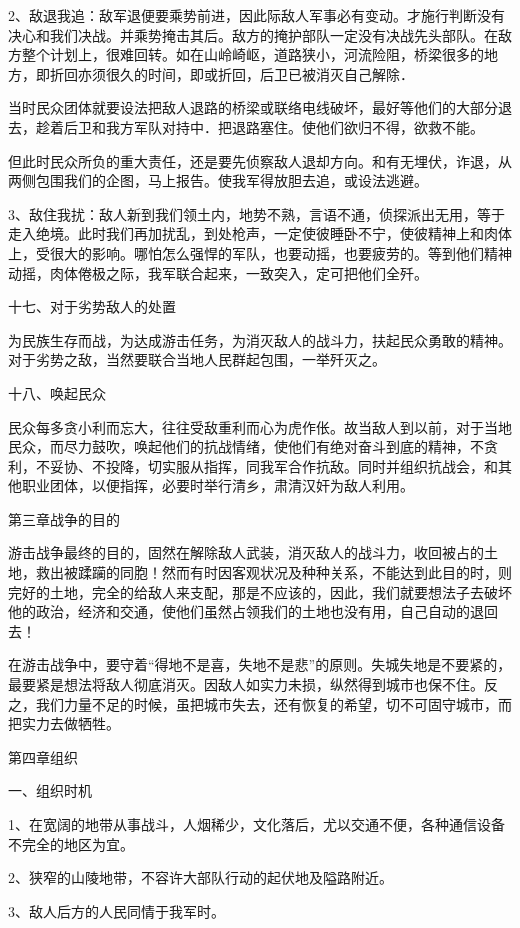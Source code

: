2、敌退我追：敌军退便要乘势前进，因此际敌人军事必有变动。才施行判断没有决心和我们决战。并乘势掩击其后。敌方的掩护部队一定没有决战先头部队。在敌方整个计划上，很难回转。如在山岭崎岖，道路狭小，河流险阻，桥梁很多的地方，即折回亦须很久的时间，即或折回，后卫已被消灭自己解除．

当时民众团体就要设法把敌人退路的桥梁或联络电线破坏，最好等他们的大部分退去，趁着后卫和我方军队对持中．把退路塞住。使他们欲归不得，欲救不能。

但此时民众所负的重大责任，还是要先侦察敌人退却方向。和有无埋伏，诈退，从两侧包围我们的企图，马上报告。使我军得放胆去追，或设法逃避。

3、敌住我扰：敌人新到我们领土内，地势不熟，言语不通，侦探派出无用，等于走入绝境。此时我们再加扰乱，到处枪声，一定使彼睡卧不宁，使彼精神上和肉体上，受很大的影响。哪怕怎么强悍的军队，也要动摇，也要疲劳的。等到他们精神动摇，肉体倦极之际，我军联合起来，一致突入，定可把他们全歼。

十七、对于劣势敌人的处置

为民族生存而战，为达成游击任务，为消灭敌人的战斗力，扶起民众勇敢的精神。对于劣势之敌，当然要联合当地人民群起包围，一举歼灭之。

十八、唤起民众

民众每多贪小利而忘大，往往受敌重利而心为虎作伥。故当敌人到以前，对于当地民众，而尽力鼓吹，唤起他们的抗战情绪，使他们有绝对奋斗到底的精神，不贪利，不妥协、不投降，切实服从指挥，同我军合作抗敌。同时并组织抗战会，和其他职业团体，以便指挥，必要时举行清乡，肃清汉奸为敌人利用。

第三章战争的目的

游击战争最终的目的，固然在解除敌人武装，消灭敌人的战斗力，收回被占的土地，救出被蹂躏的同胞！然而有时因客观状况及种种关系，不能达到此目的时，则完好的土地，完全的给敌人来支配，那是不应该的，因此，我们就要想法子去破坏他的政治，经济和交通，使他们虽然占领我们的土地也没有用，自己自动的退回去！

在游击战争中，要守着“得地不是喜，失地不是悲”的原则。失城失地是不要紧的，最要紧是想法将敌人彻底消灭。因敌人如实力未损，纵然得到城市也保不住。反之，我们力量不足的时候，虽把城市失去，还有恢复的希望，切不可固守城市，而把实力去做牺牲。

第四章组织

一、组织时机

1、在宽阔的地带从事战斗，人烟稀少，文化落后，尤以交通不便，各种通信设备不完全的地区为宜。

2、狭窄的山陵地带，不容许大部队行动的起伏地及隘路附近。

3、敌人后方的人民同情于我军时。

